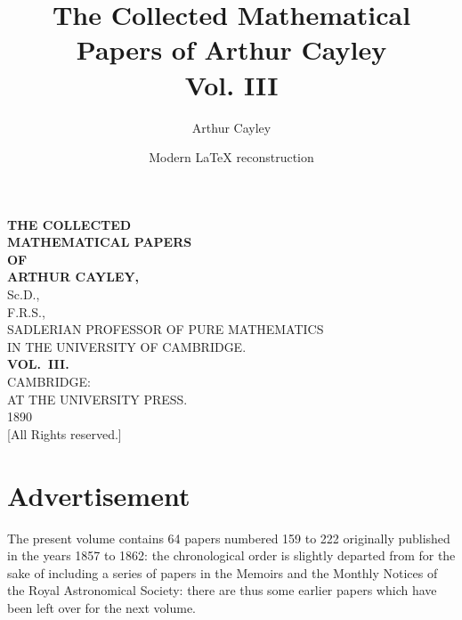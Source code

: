 \documentclass[11pt,a4paper]{book}
\title{The Collected Mathematical Papers of Arthur Cayley\\Vol. III}
\author{Arthur Cayley}
\date{Modern \LaTeX{} reconstruction}
\begin{document}
\maketitle


\thispagestyle{empty}
\begin{center}
\vspace*{2cm}

{\LARGE\bfseries THE COLLECTED}\\[0.5em]
{\LARGE\bfseries MATHEMATICAL PAPERS}\\[1em]
{\large\bfseries OF}\\[1em]
{\LARGE\bfseries ARTHUR CAYLEY,}\\[0.5em]
{\large Sc.D.,}\\[0.3em]
{\large F.R.S.,}\\[0.5em]
{\large SADLERIAN PROFESSOR OF PURE MATHEMATICS}\\[0.3em]
{\large IN THE UNIVERSITY OF CAMBRIDGE.}\\[2em]

{\Huge\bfseries VOL.~III.}\\[3em]

{\large CAMBRIDGE:}\\[0.3em]
{\large AT THE UNIVERSITY PRESS.}\\[1em]
{\large 1890}\\[0.5em]
{\small [All Rights reserved.]}

\vfill
\end{center}
\clearpage

\section*{Advertisement}

The present volume contains 64 papers numbered 159 to 222 originally published in the years 1857 to 1862: the chronological order is slightly departed from for the sake of including a series of papers in the Memoirs and the Monthly Notices of the Royal Astronomical Society: there are thus some earlier papers which have been left over for the next volume.
\end{document}
